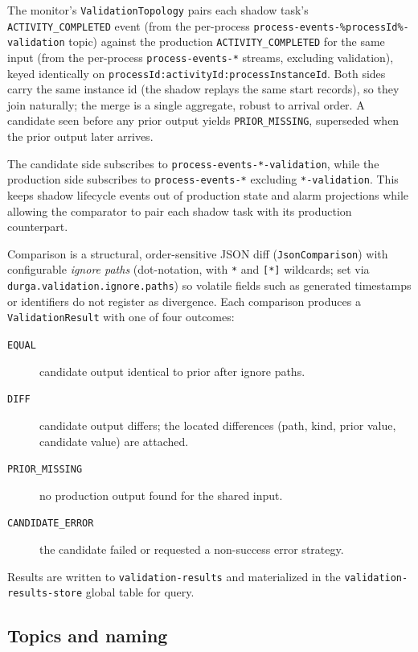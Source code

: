 The monitor's \texttt{ValidationTopology} pairs each shadow task's
\texttt{ACTIVITY\_COMPLETED} event (from the per-process \texttt{process-events-\%processId\%-validation} topic)
against the production \texttt{ACTIVITY\_COMPLETED} for the same input (from the
per-process \texttt{process-events-*} streams, excluding validation), keyed identically
on \texttt{processId:activityId:processInstanceId}. Both sides carry the same instance id
(the shadow replays the same start records), so they join naturally; the merge is a
single aggregate, robust to arrival order. A candidate seen before any prior output
yields \texttt{PRIOR\_MISSING}, superseded when the prior output later arrives.

The candidate side subscribes to \texttt{process-events-*-validation}, while the
production side subscribes to \texttt{process-events-*} excluding \texttt{*-validation}.
This keeps shadow lifecycle events out of production state and alarm projections while
allowing the comparator to pair each shadow task with its production counterpart.

Comparison is a structural, order-sensitive JSON diff (\texttt{JsonComparison}) with
configurable \emph{ignore paths} (dot-notation, with \texttt{*} and \texttt{[*]}
wildcards; set via \texttt{durga.validation.ignore.paths}) so volatile fields such as
generated timestamps or identifiers do not register as divergence. Each comparison
produces a \texttt{ValidationResult} with one of four outcomes:

\begin{description}
\item[\texttt{EQUAL}] candidate output identical to prior after ignore paths.
\item[\texttt{DIFF}] candidate output differs; the located differences (path, kind,
  prior value, candidate value) are attached.
\item[\texttt{PRIOR\_MISSING}] no production output found for the shared input.
\item[\texttt{CANDIDATE\_ERROR}] the candidate failed or requested a non-success
  error strategy.
\end{description}

Results are written to \texttt{validation-results} and materialized in the
\texttt{validation-results-store} global table for query.

\subsection{Topics and naming}

